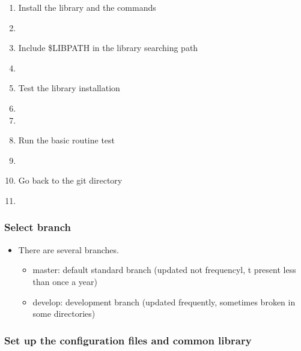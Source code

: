 \documentclass[11pt]{article}
\begin{document}
\begin{enumerate}
\item
Install the library and the commands
\item[\qquad]
\item
Include \$LIBPATH in the library searching path
\item[\qquad]
\item
Test the library installation
\item[\qquad]
\item[\qquad]
\item
Run the basic routine test
\item[\qquad]
\item
Go back to the git directory
\item[\qquad]
\end{enumerate}

\subsubsection{Select branch}

\begin{itemize}
\item
  There are several branches.
  \begin{itemize}
  \item
    master: default standard branch (updated not frequencyl, t present
    less than once a year)
  \item
    develop: development branch (updated frequently, sometimes broken
    in some directories)
  \end{itemize}
\end{itemize}

\subsubsection{Set up the configuration files and common library}
\end{document}
